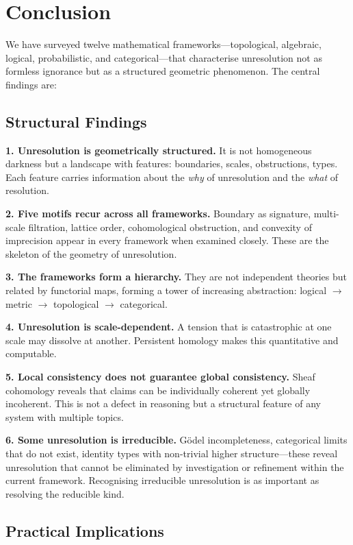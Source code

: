 \documentclass[11pt,letterpaper]{article}
\theoremstyle{definition}
\theoremstyle{remark}
\begin{document}
\section{Conclusion}
\label{sec:conclusion}

We have surveyed twelve mathematical frameworks---topological, algebraic, logical, probabilistic, and categorical---that characterise unresolution not as formless ignorance but as a structured geometric phenomenon. The central findings are:

\subsection*{Structural Findings}

\textbf{1. Unresolution is geometrically structured.} It is not homogeneous darkness but a landscape with features: boundaries, scales, obstructions, types. Each feature carries information about the \emph{why} of unresolution and the \emph{what} of resolution.

\textbf{2. Five motifs recur across all frameworks.} Boundary as signature, multi-scale filtration, lattice order, cohomological obstruction, and convexity of imprecision appear in every framework when examined closely. These are the skeleton of the geometry of unresolution.

\textbf{3. The frameworks form a hierarchy.} They are not independent theories but related by functorial maps, forming a tower of increasing abstraction: logical $\to$ metric $\to$ topological $\to$ categorical.

\textbf{4. Unresolution is scale-dependent.} A tension that is catastrophic at one scale may dissolve at another. Persistent homology makes this quantitative and computable.

\textbf{5. Local consistency does not guarantee global consistency.} Sheaf cohomology reveals that claims can be individually coherent yet globally incoherent. This is not a defect in reasoning but a structural feature of any system with multiple topics.

\textbf{6. Some unresolution is irreducible.} Gödel incompleteness, categorical limits that do not exist, identity types with non-trivial higher structure---these reveal unresolution that cannot be eliminated by investigation or refinement within the current framework. Recognising irreducible unresolution is as important as resolving the reducible kind.

\subsection*{Practical Implications}
\end{document}

